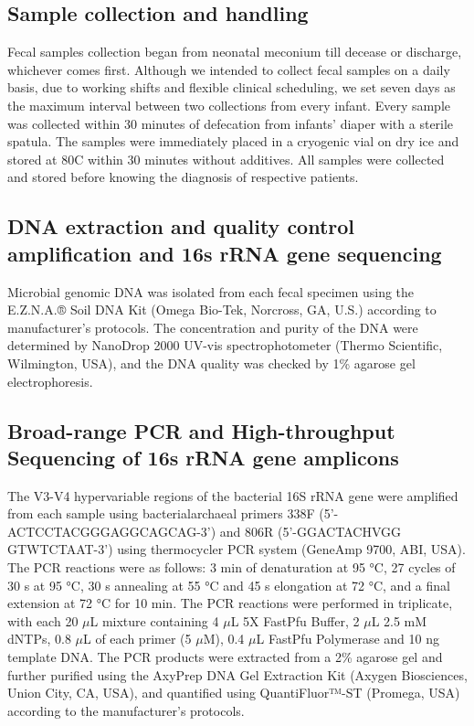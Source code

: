 \documentclass[fleqn,10pt]{wlpeerj} %
\begin{document}
  \subsection*{Sample collection and handling}
  Fecal samples collection began from neonatal meconium till decease or discharge, whichever comes first. Although we intended to collect fecal samples on a daily basis, due to working shifts and flexible clinical scheduling, we set seven days as the maximum interval between two collections from every infant. Every sample was collected within 30 minutes of defecation from infants' diaper with a sterile spatula. The samples were immediately placed in a cryogenic vial on dry ice and stored at 80\textdegree{}C within 30 minutes without additives. All samples were collected and stored before knowing the diagnosis of respective patients.

  \subsection*{DNA extraction and quality control amplification and 16s rRNA gene sequencing}
  Microbial genomic DNA was isolated from each fecal specimen using the E.Z.N.A.® Soil DNA Kit (Omega Bio-Tek, Norcross, GA, U.S.) according to manufacturer’s protocols. The concentration and purity of the DNA were determined by NanoDrop 2000 UV-vis spectrophotometer (Thermo Scientific, Wilmington, USA), and the DNA quality was checked by 1\% agarose gel electrophoresis.

  \subsection*{Broad-range PCR and High-throughput Sequencing of 16s rRNA gene amplicons}
  The V3-V4 hypervariable regions of the bacterial 16S rRNA gene were amplified from each sample using bacterial\/archaeal primers 338F (5’-ACTCCTACGGGAGGCAGCAG-3’) and 806R (5’-GGACTACHVGG GTWTCTAAT-3’) using thermocycler PCR system (GeneAmp 9700, ABI, USA). The PCR reactions were as follows: 3 min of denaturation at 95 °C, 27 cycles of 30 s at 95 °C, 30 s annealing at 55 °C and 45 s elongation at 72 °C, and a final extension at 72 °C for 10 min. The PCR reactions were performed in triplicate, with each 20 $\mu$L mixture containing 4 $\mu$L 5X FastPfu Buffer, 2 $\mu$L 2.5 mM dNTPs, 0.8 $\mu$L of each primer (5 $\mu$M), 0.4 $\mu$L FastPfu Polymerase and 10 ng template DNA. The PCR products were extracted from a 2\% agarose gel and further purified using the AxyPrep DNA Gel Extraction Kit (Axygen Biosciences, Union City, CA, USA), and quantified using QuantiFluor™-ST (Promega, USA) according to the manufacturer’s protocols.\\
\end{document}
